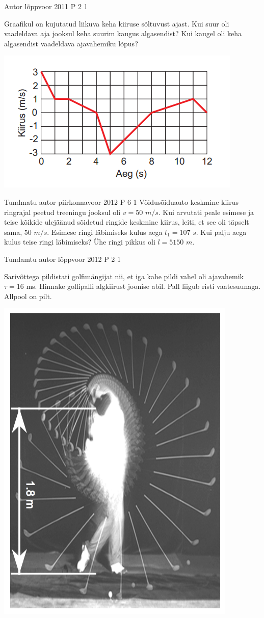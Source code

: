 \documentclass[11pt]{article}
\begin{document}
{%
{Autor} %
{lõppvoor} %
{2011} %
{P 2} %
{1} %
{
\ifStatement
Graafikul on kujutatud liikuva keha kiiruse sõltuvust ajast. Kui suur oli vaadeldava aja jooksul keha suurim kaugus algasendist? Kui kaugel oli keha algasendist vaadeldava ajavahemiku lõpus?
\begin{center}
	\includegraphics[width=0.5\linewidth]{2011-v3p-02-yl.PNG}
\end{center}
\fi
}



{Tundmatu autor} %
{piirkonnavoor} %
{2012} %
{P 6} %
{1} %
{
\ifStatement
Võidusõiduauto keskmine kiirus ringrajal peetud treeningu jooksul oli $v = 50$ $m/s$. Kui arvutati peale esimese ja teise kõikide ulejäänud sõidetud ringide keskmine kiirus, leiti, et see oli täpselt sama, $50$ $m/s$. Esimese ringi läbimiseks kulus aega $t_1 = 107$ $s$. Kui palju aega kulus teise ringi läbimiseks? Ühe ringi pikkus oli $l = 5150$ $m$.
\fi
}


{Tundamtu autor} %
{lõppvoor} %
{2012} %
{P 2} %
{1} %
{
\ifStatement
Sarivõttega pildistati golfimängijat nii, et iga kahe pildi vahel oli ajavahemik $\tau = 16$ ms. Hinnake golfipalli algkiirust joonise abil. Pall liigub risti vaatesuunaga. Allpool on pilt.
\begin{center}
	\includegraphics[width=0.5\linewidth]{2012-v3p-02-yl.PNG}
\end{center}
\fi
}


}
\end{document}
